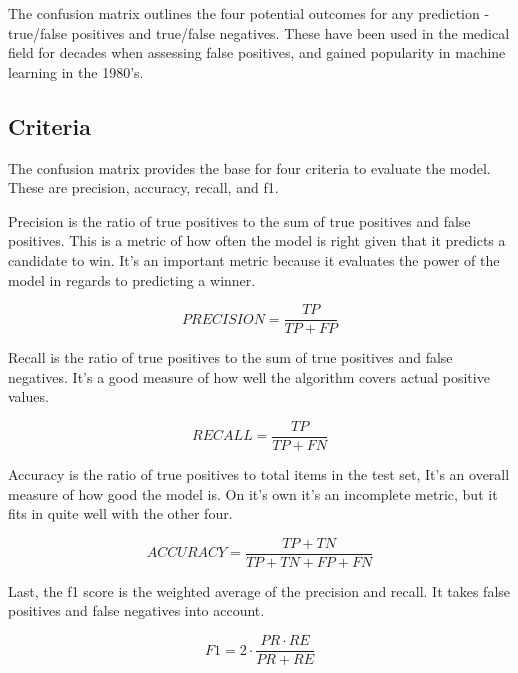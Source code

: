 \documentclass[11pt, twoside, reqno]{article}
\begin{document}
The confusion matrix outlines the four potential outcomes for any prediction - true/false positives and true/false negatives. These have been used in the medical field for decades when assessing false positives, and gained popularity in machine learning in the 1980's. 

\subsection{Criteria}
\label{subsec:criteria}
\hspace{0.2in} The confusion matrix provides the base for four criteria to evaluate the model. These are precision, accuracy, recall, and f1.

Precision is the ratio of true positives to the sum of true positives and false positives. This is a metric of how often the model is right given that it predicts a candidate to win. It's an important metric because it evaluates the power of the model in regards to predicting a winner. 

\begin{equation}
\label{eq:precision}
PRECISION = \dfrac{TP}{TP+FP}
\end{equation}

Recall is the ratio of true positives to the sum of true positives and false negatives. It's a good measure of how well the algorithm covers actual positive values. 

\begin{equation}
\label{eq:recall}
RECALL = \dfrac{TP}{TP+FN}
\end{equation}

Accuracy is the ratio of true positives to total items in the test set, It's an overall measure of how good the model is. On it's own it's an incomplete metric, but it fits in quite well with the other four. 

\begin{equation}
\label{eq:accuracy}
ACCURACY = \dfrac{TP+TN}{TP+TN+FP+FN}
\end{equation}

Last, the f1 score is the weighted average of the precision and recall. It takes false positives and false negatives into account. 

\begin{equation}
\label{eq:f1}
F1 = 2 \cdot \dfrac{PR \cdot RE}{PR + RE}
\end{equation}
\end{document}
